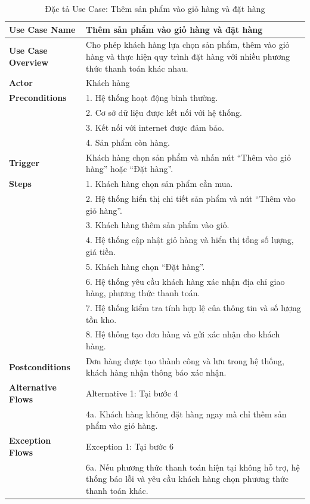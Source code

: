 {\begin{longtable}{|>{\bfseries}p{4cm}|p{11.5cm}|}
\caption{Đặc tả Use Case: Thêm sản phẩm vào giỏ hàng và đặt hàng}
\label{tab:uc-add-to-cart-checkout} \\
\hline
\textbf{Use Case Name} & Thêm sản phẩm vào giỏ hàng và đặt hàng \\
\hline
\textbf{Use Case Overview} & Cho phép khách hàng lựa chọn sản phẩm, thêm vào giỏ hàng và thực hiện quy trình đặt hàng với nhiều phương thức thanh toán khác nhau. \\
\hline
\textbf{Actor} & Khách hàng \\
\hline
\textbf{Preconditions} & 1. Hệ thống hoạt động bình thường. \\
& 2. Cơ sở dữ liệu được kết nối với hệ thống. \\
& 3. Kết nối với internet được đảm bảo. \\
& 4. Sản phẩm còn hàng. \\
\hline
\textbf{Trigger} & Khách hàng chọn sản phẩm và nhấn nút “Thêm vào giỏ hàng” hoặc “Đặt hàng”. \\
\hline
\textbf{Steps} & 1. Khách hàng chọn sản phẩm cần mua. \\
& 2. Hệ thống hiển thị chi tiết sản phẩm và nút “Thêm vào giỏ hàng”. \\
& 3. Khách hàng thêm sản phẩm vào giỏ. \\
& 4. Hệ thống cập nhật giỏ hàng và hiển thị tổng số lượng, giá tiền. \\
& 5. Khách hàng chọn “Đặt hàng”. \\
& 6. Hệ thống yêu cầu khách hàng xác nhận địa chỉ giao hàng, phương thức thanh toán. \\
& 7. Hệ thống kiểm tra tính hợp lệ của thông tin và số lượng tồn kho. \\
& 8. Hệ thống tạo đơn hàng và gửi xác nhận cho khách hàng. \\
\hline
\textbf{Postconditions} & Đơn hàng được tạo thành công và lưu trong hệ thống, khách hàng nhận thông báo xác nhận. \\
\hline
\textbf{Alternative Flows} & Alternative 1: Tại bước 4 \\
& 4a. Khách hàng không đặt hàng ngay mà chỉ thêm sản phẩm vào giỏ hàng. \\
\hline
\textbf{Exception Flows} & Exception 1: Tại bước 6 \\
& 6a. Nếu phương thức thanh toán hiện tại không hỗ trợ, hệ thống báo lỗi và yêu cầu khách hàng chọn phương thức thanh toán khác. \\
\hline
\end{longtable}

}
